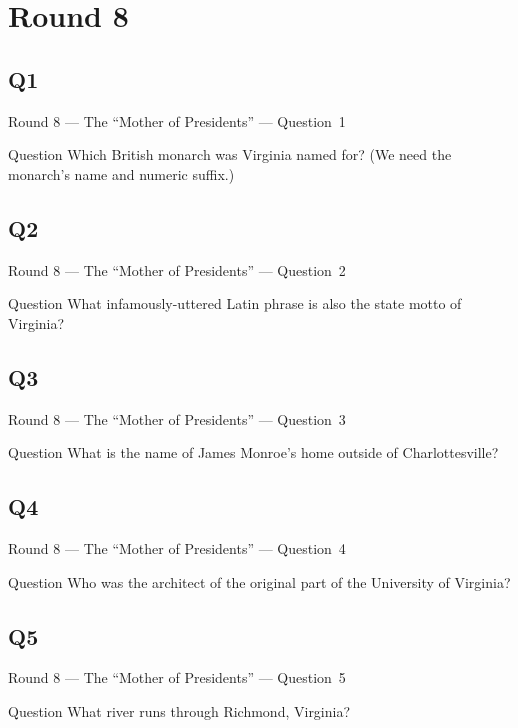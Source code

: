 \documentclass[11pt]{beamer}
\begin{document}
\section{Round 8}
\subsection*{Q1}
\begin{frame}[t]{Round 8 --- The ``Mother of Presidents'' --- \mbox{Question 1}}
\vspace{-0.5em}
\begin{block}{Question}
Which British monarch was Virginia named for? (We need the monarch's name and numeric suffix.)
\end{block}
\end{frame}
\subsection*{Q2}
\begin{frame}[t]{Round 8 --- The ``Mother of Presidents'' --- \mbox{Question 2}}
\vspace{-0.5em}
\begin{block}{Question}
What infamously-uttered  Latin phrase is also the state motto of Virginia?
\end{block}
\end{frame}
\subsection*{Q3}
\begin{frame}[t]{Round 8 --- The ``Mother of Presidents'' --- \mbox{Question 3}}
\vspace{-0.5em}
\begin{block}{Question}
What is the name of James Monroe's home outside of Charlottesville?
\end{block}
\end{frame}
\subsection*{Q4}
\begin{frame}[t]{Round 8 --- The ``Mother of Presidents'' --- \mbox{Question 4}}
\vspace{-0.5em}
\begin{block}{Question}
Who was the architect of the original part of the University of Virginia?
\end{block}
\end{frame}
\subsection*{Q5}
\begin{frame}[t]{Round 8 --- The ``Mother of Presidents'' --- \mbox{Question 5}}
\vspace{-0.5em}
\begin{block}{Question}
What river runs through Richmond, Virginia?
\end{block}
\end{frame}
\end{document}

